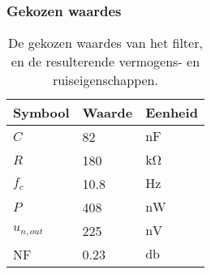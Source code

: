 \begin{frame}
    \frametitle{Gekozen waardes}

    \begin{table}[ht]
        \centering
        \begin{tabular}{l|l|l}
            Symbool & Waarde & Eenheid \\
            \hline
            $C$         & 82    & $\si{\nano\farad}$\\
            $R$         & 180   & $\si{\kilo\ohm}$  \\
            $f_c$       & 10.8  & $\si{\hertz}$     \\
            $P$         & 408   & $\si{\nano\watt}$ \\
            $u_{n,out}$ & 225   & $\si{\nano\volt}$ \\
            NF          & 0.23  & $\si{\decibel}$   \\
        \end{tabular}
        \caption{De gekozen waardes van het filter, en de resulterende vermogens- en ruiseigenschappen.}
        \label{tab:filterValues}
    \end{table}

\end{frame}